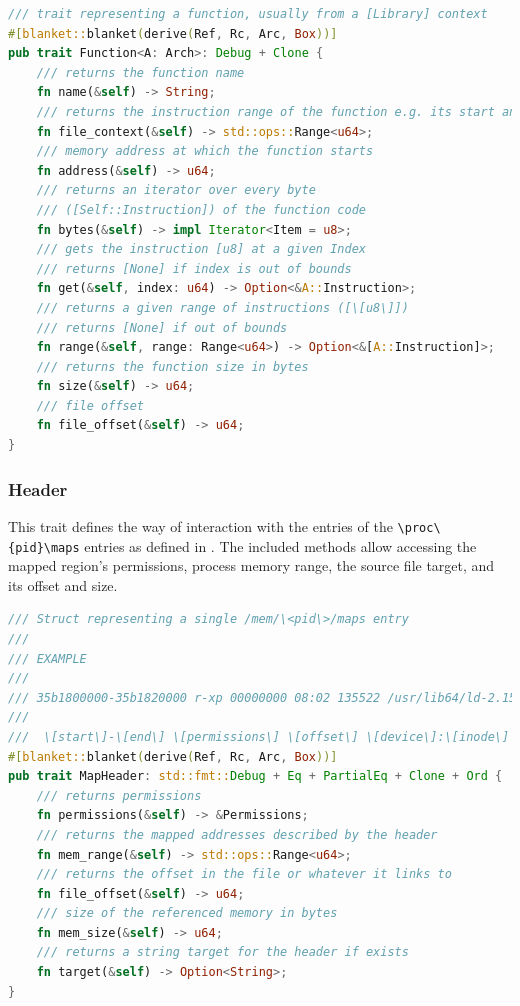 \begin{lstlisting}[caption=\label{lst:function}"The Function Trait definition", language=Rust]
/// trait representing a function, usually from a [Library] context
#[blanket::blanket(derive(Ref, Rc, Arc, Box))]
pub trait Function<A: Arch>: Debug + Clone {
    /// returns the function name
    fn name(&self) -> String;
    /// returns the instruction range of the function e.g. its start and end
    fn file_context(&self) -> std::ops::Range<u64>;
    /// memory address at which the function starts
    fn address(&self) -> u64;
    /// returns an iterator over every byte 
    /// ([Self::Instruction]) of the function code
    fn bytes(&self) -> impl Iterator<Item = u8>;
    /// gets the instruction [u8] at a given Index
    /// returns [None] if index is out of bounds
    fn get(&self, index: u64) -> Option<&A::Instruction>;
    /// returns a given range of instructions ([\[u8\]])
    /// returns [None] if out of bounds
    fn range(&self, range: Range<u64>) -> Option<&[A::Instruction]>;
    /// returns the function size in bytes
    fn size(&self) -> u64;
    /// file offset
    fn file_offset(&self) -> u64;
}
\end{lstlisting}

    \subsubsection{Header}
     \label{reader:header}
    
    This trait defines the way of interaction with the entries of the \verb|\proc\{pid}\maps| entries as defined in \cite{kerrisk_proc_pid_maps5_2024}.
    The included methods allow accessing the mapped region's permissions, process memory range, the source file target, and its offset and size. 
\begin{lstlisting}[caption=\label{lst:header}"The Header Trait definition", language=Rust]
/// Struct representing a single /mem/\<pid\>/maps entry
///
/// EXAMPLE
///
/// 35b1800000-35b1820000 r-xp 00000000 08:02 135522 /usr/lib64/ld-2.15.so
///
///  \[start\]-\[end\] \[permissions\] \[offset\] \[device\]:\[inode\] \[links_to\]
#[blanket::blanket(derive(Ref, Rc, Arc, Box))]
pub trait MapHeader: std::fmt::Debug + Eq + PartialEq + Clone + Ord {
    /// returns permissions
    fn permissions(&self) -> &Permissions;
    /// returns the mapped addresses described by the header
    fn mem_range(&self) -> std::ops::Range<u64>;
    /// returns the offset in the file or whatever it links to
    fn file_offset(&self) -> u64;
    /// size of the referenced memory in bytes
    fn mem_size(&self) -> u64;
    /// returns a string target for the header if exists
    fn target(&self) -> Option<String>;
}    
\end{lstlisting}
 


